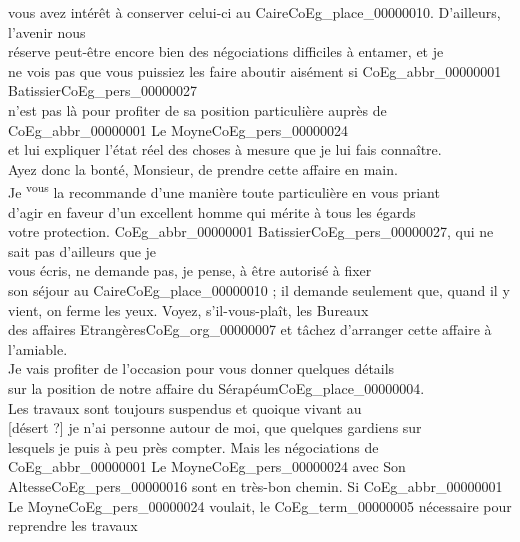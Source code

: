 \documentclass{book}
\begin{document}
vous avez intérêt à conserver celui-ci au Caire\gls{CoEg_place_00000010}. D’ailleurs, l’avenir nous\\
réserve peut-être encore bien des négociations difficiles à entamer, et je\\
ne vois pas que vous puissiez les faire aboutir aisément si \gls{CoEg_abbr_00000001} Batissier\gls{CoEg_pers_00000027}\\
n’est pas là pour profiter de sa position particulière auprès de \gls{CoEg_abbr_00000001} Le Moyne\gls{CoEg_pers_00000024}\\
et lui expliquer l’état réel des choses à mesure que je lui fais connaître.\\
\indent Ayez donc la bonté, Monsieur, de prendre cette affaire en main.\\
Je \textsuperscript{vous} la recommande d’une manière toute particulière en vous priant\\
d’agir en faveur d’un excellent homme qui mérite à tous les égards\\
votre protection. \gls{CoEg_abbr_00000001} Batissier\gls{CoEg_pers_00000027}, qui ne sait pas d’ailleurs que je\\
vous écris, ne demande pas, je pense, à être autorisé à fixer\\
son séjour au Caire\gls{CoEg_place_00000010} ; il demande seulement que, quand il y\\
vient, on ferme les yeux. Voyez, s’il-vous-plaît, les Bureaux\\
des affaires Etrangères\gls{CoEg_org_00000007} et tâchez d’arranger cette affaire à\\
l’amiable.\\
\indent Je vais profiter de l’occasion pour vous donner quelques détails\\
sur la position de notre affaire du Sérapéum\gls{CoEg_place_00000004}.\\
\indent Les travaux sont toujours suspendus et quoique vivant au\\
{[désert ?]} je n’ai personne autour de moi, que quelques gardiens sur\\
lesquels je puis à peu près compter. Mais les négociations de\\
\gls{CoEg_abbr_00000001} Le Moyne\gls{CoEg_pers_00000024} avec Son Altesse\gls{CoEg_pers_00000016} sont en très-bon chemin. Si \gls{CoEg_abbr_00000001}\\
Le Moyne\gls{CoEg_pers_00000024} voulait, le \gls{CoEg_term_00000005} nécessaire pour reprendre les travaux\\
\end{document}
